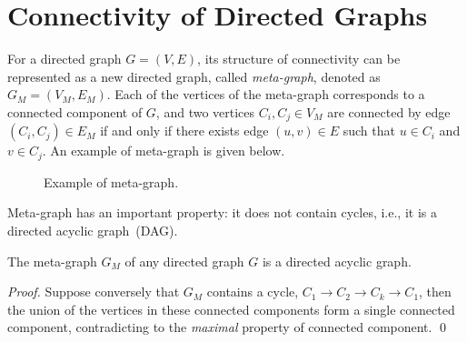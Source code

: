 \setcounter{definition}{0} \setcounter{property}{0} \setcounter{claim}{0} \setcounter{fact}{0} \setcounter{corollary}{0} \setcounter{figure}{0}
\section{Connectivity of Directed Graphs}

For a directed graph $G = (V,E)$, its structure of connectivity can be represented as a new
directed graph, called \emph{meta-graph}, denoted as $G_M = (V_M, E_M)$.
Each of the vertices of the meta-graph corresponds to a connected component of $G$,
and two vertices $C_i, C_j  \in V_M$ are connected by edge $(C_i, C_j) \in E_M$
if and only if there exists edge $(u,v)\in E$ such that $u\in C_i$ and $v\in C_j$.
An example of meta-graph is given below.

\begin{figure}[h!]
\centering{}
\caption{Example of meta-graph.}
\label{fig:meta-graph}
\end{figure}

Meta-graph has an important property: it does not contain cycles, i.e., it is a directed acyclic graph~(DAG).

\begin{claim}
The meta-graph $G_M$ of any directed graph $G$ is a directed acyclic graph.
\end{claim}

\emph{Proof.} Suppose conversely that $G_M$ contains a cycle, $C_1 \to C_2 \to C_k \to C_1$,
then the union of the vertices in these connected components form a single connected component,
contradicting to the \emph{maximal} property of connected component. \qed

